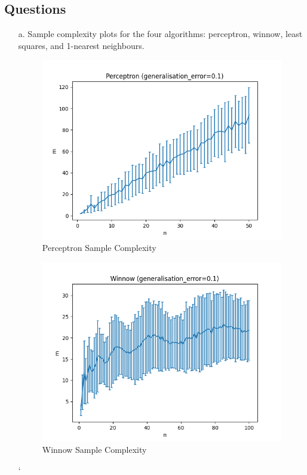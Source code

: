 \documentclass[12pt]{article}
\begin{document}
\subsection{Questions}
\begin{itemize}
    \item[a.] Sample complexity plots for the four algorithms: perceptron, winnow, least squares, and 1-nearest neighbours.


    \begin{figure}[h]
    \centering
    \includegraphics[scale=0.6]{outputs/part3/q1a_perceptron_sample_complexity.png}
    \caption{Perceptron Sample Complexity}
    \label{fig:14}
    \end{figure}


    \begin{figure}[h]
    \centering
    \includegraphics[scale=0.6]{outputs/part3/q1a_winnow_sample_complexity.png}
    \caption{Winnow Sample Complexity}
    \label{fig:15}
    \end{figure}
\newpage
`


\end{itemize}
\end{document}
